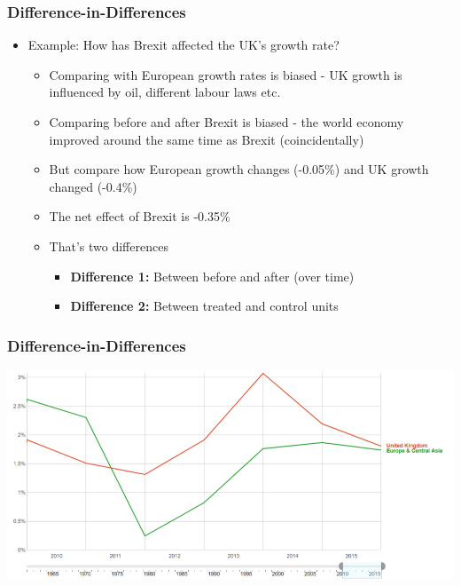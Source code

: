 \documentclass[xcolor=x11names,compress]{beamer}\usepackage[]{graphicx}\usepackage[]{color}
\renewcommand{\(}{\begin{columns}}
\renewcommand{\)}{\end{columns}}
\newcommand{\<}[1]{\begin{column}{#1}}
\renewcommand{\>}{\end{column}}
\begin{document}
\begin{frame}
\frametitle{Difference-in-Differences}
\begin{itemize}
\item Example: How has Brexit affected the UK's growth rate?
\pause
\begin{itemize}
\item Comparing with European growth rates is biased - UK growth is influenced by oil, different labour laws etc.
\pause
\item Comparing before and after Brexit is biased - the world economy improved around the same time as Brexit (coincidentally)
\pause
\item But compare how European growth changes (-0.05\%) and UK growth changed (-0.4\%)
\pause
\item The net effect of Brexit is -0.35\%
\pause
\item That's two differences
\begin{itemize}
\item \textbf{Difference 1:} Between before and after (over time)
\item \textbf{Difference 2:} Between treated and control units
\pause
\end{itemize}
\end{itemize}
\end{itemize}
\end{frame}

\begin{frame}
\frametitle{Difference-in-Differences}
\begin{center}
\includegraphics[scale=0.3]{figure/UK_growth.png}
\end{center}
\end{frame}
\end{document}
